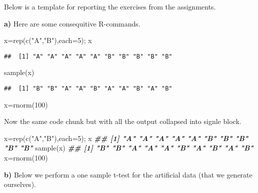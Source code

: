 \documentclass[
  11pt,
]{article}
\newenvironment{Shaded}{\begin{snugshade}}{\end{snugshade}}
\newcommand{\AttributeTok}[1]{\textcolor[rgb]{0.77,0.63,0.00}{#1}}
\newcommand{\DecValTok}[1]{\textcolor[rgb]{0.00,0.00,0.81}{#1}}
\newcommand{\DocumentationTok}[1]{\textcolor[rgb]{0.56,0.35,0.01}{\textbf{\textit{#1}}}}
\newcommand{\FunctionTok}[1]{\textcolor[rgb]{0.00,0.00,0.00}{#1}}
\newcommand{\NormalTok}[1]{#1}
\newcommand{\OtherTok}[1]{\textcolor[rgb]{0.56,0.35,0.01}{#1}}
\newcommand{\StringTok}[1]{\textcolor[rgb]{0.31,0.60,0.02}{#1}}
\begin{document}
Below is a template for reporting the exercises from the assignments.

\textbf{a)} Here are some consequitive R-commands.

\begin{Shaded}
\begin{Highlighting}[]
\NormalTok{x}\OtherTok{=}\FunctionTok{rep}\NormalTok{(}\FunctionTok{c}\NormalTok{(}\StringTok{"A"}\NormalTok{,}\StringTok{"B"}\NormalTok{),}\AttributeTok{each=}\DecValTok{5}\NormalTok{); x}
\end{Highlighting}
\end{Shaded}

\begin{verbatim}
##  [1] "A" "A" "A" "A" "A" "B" "B" "B" "B" "B"
\end{verbatim}

\begin{Shaded}
\begin{Highlighting}[]
\FunctionTok{sample}\NormalTok{(x)}
\end{Highlighting}
\end{Shaded}

\begin{verbatim}
##  [1] "B" "B" "A" "A" "B" "A" "A" "B" "A" "B"
\end{verbatim}

\begin{Shaded}
\begin{Highlighting}[]
\NormalTok{x}\OtherTok{=}\FunctionTok{rnorm}\NormalTok{(}\DecValTok{100}\NormalTok{)}
\end{Highlighting}
\end{Shaded}

Now the same code chunk but with all the output collapsed into signle
block.

\begin{Shaded}
\begin{Highlighting}[]
\NormalTok{x}\OtherTok{=}\FunctionTok{rep}\NormalTok{(}\FunctionTok{c}\NormalTok{(}\StringTok{"A"}\NormalTok{,}\StringTok{"B"}\NormalTok{),}\AttributeTok{each=}\DecValTok{5}\NormalTok{); x}
\DocumentationTok{\#\#  [1] "A" "A" "A" "A" "A" "B" "B" "B" "B" "B"}
\FunctionTok{sample}\NormalTok{(x)}
\DocumentationTok{\#\#  [1] "B" "B" "A" "A" "A" "B" "A" "B" "A" "B"}
\NormalTok{x}\OtherTok{=}\FunctionTok{rnorm}\NormalTok{(}\DecValTok{100}\NormalTok{)}
\end{Highlighting}
\end{Shaded}

\textbf{b)} Below we perform a one sample t-test for the artificial data
(that we generate ourselves).
\end{document}
